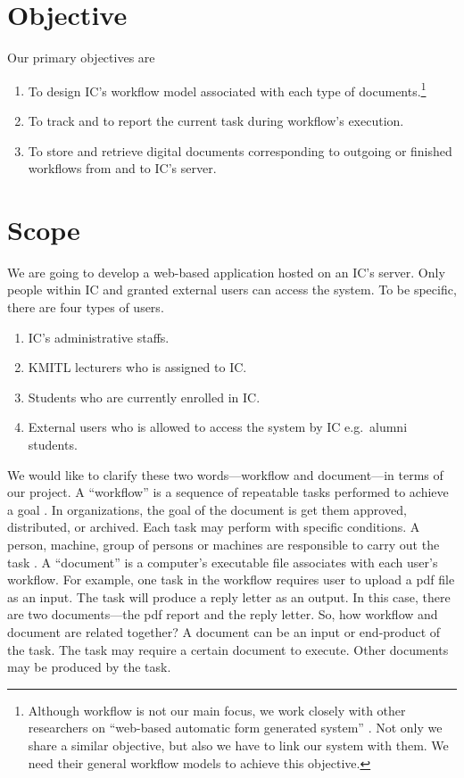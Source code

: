 \section{Objective}
Our primary objectives are
\begin{enumerate}
\item To design IC's workflow model associated with each type of documents.\footnote{
	Although workflow is not our main focus, we work closely with other researchers on \enquote{web-based automatic form generated system} \cite{web-based-form}.
	Not only we share a similar objective, but also we have to link our system with them.
	We need their general workflow models to achieve this objective.
	}
\item To track and to report the current task during workflow's execution.
\item To store and retrieve digital documents corresponding to outgoing or finished workflows from and to IC's server.
\end{enumerate}

\section{Scope}
We are going to develop a web-based application hosted on an IC's server.
Only people within IC and granted external users can access the system.
To be specific, there are four types of users.
\begin{enumerate}
\item IC's administrative staffs.
\item KMITL lecturers who is assigned to IC.
\item Students who are currently enrolled in IC.
\item External users who is allowed to access the system by IC e.g.\ alumni students.
\end{enumerate}

We would like to clarify these two words---workflow and document---in terms of our project. %
A \enquote{workflow} is a sequence of repeatable tasks performed to achieve a goal \cite{Jablonski:1996:WMM}. 
In organizations, the goal of the document is get them approved, distributed, or archived.
Each task may perform with specific conditions.
A person, machine, group of persons or machines are responsible to carry out the task \cite{wfMangement}. 
A \enquote{document} is a computer's executable file associates with each user's workflow.
For example, one task in the workflow requires user to upload a \gls{pdf} file as an input.
The task will produce a reply letter as an output.
In this case, there are two documents---the \gls{pdf} report and the reply letter.
So, how workflow and document are related together?
A document can be an input or end-product of the task.
The task may require a certain document to execute.
Other documents may be produced by the task.

